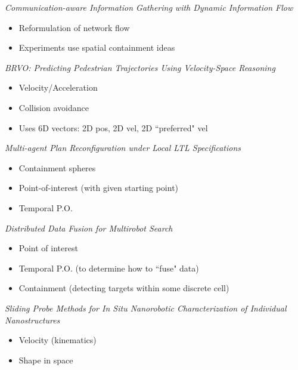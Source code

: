 \documentclass[12pt]{article}
\begin{document}
{\sl Communication-aware Information Gathering with
Dynamic Information Flow}
\cite{kassir2014communication}
\begin{itemize}
  \item Reformulation of network flow
  \item Experiments use spatial containment ideas
\end{itemize}

{\sl BRVO: Predicting Pedestrian Trajectories Using
Velocity-Space Reasoning}
\cite{kim2014brvo}
\begin{itemize}
  \item Velocity/Acceleration
  \item Collision avoidance
  \item Uses 6D vectors: 2D pos, 2D vel, 2D ``preferred" vel
\end{itemize}

{\sl Multi-agent Plan Reconfiguration under Local
LTL Specifications}
\cite{guo2014multi}
\begin{itemize}
  \item Containment spheres
  \item Point-of-interest (with given starting point)
  \item Temporal P.O.
\end{itemize}

{\sl Distributed Data Fusion for Multirobot Search}
\cite{hollingerdistributed}
\begin{itemize}
  \item Point of interest
  \item Temporal P.O. (to determine how to ``fuse" data)
  \item Containment (detecting targets within some 
                     discrete cell)
\end{itemize}

{\sl Sliding Probe Methods for \textit{In Situ} Nanorobotic
Characterization of Individual Nanostructures}
\cite{fansliding}
\begin{itemize}
  \item Velocity (kinematics)
  \item Shape in space
\end{itemize}



\end{document}
